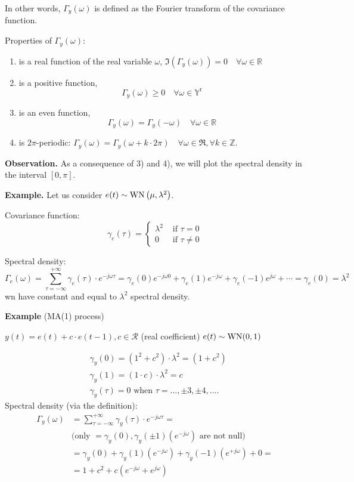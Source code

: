 In other words, $\Gamma_y(\omega)$ is defined as the Fourier transform of the covariance function.

Properties of $\Gamma_{y}(\omega)$:
\begin{enumerate}
	\item is a real function of the real variable $\omega$, $\Im\left(\Gamma_{y}(\omega)\right)=0 \quad \forall \omega \in \mathbb{R}$
	\item is a positive function,
	$$
		\Gamma_{y}(\omega) \geq 0 \quad \forall \omega \in \mathbb{Y}^{\mathrm{r}}
	$$
	\item is an even function,
	$$
		\Gamma_{y}(\omega)=\Gamma_{y}(-\omega) \quad \forall \omega \in \mathbb{R}
	$$
	\item is $2\pi$-periodic: $\Gamma_{y}(\omega)=\Gamma_{y}(\omega+k \cdot 2 \pi) \quad \forall \omega \in \Re, \forall k \in \mathbb{Z}$.
\end{enumerate}

\textbf{Observation.}
As a consequence of 3) and 4), we will plot the spectral density in the interval $[0, \pi]$.

\textbf{Example.}
Let us consider $e(t) \sim \operatorname{WN}\left(\mu, \lambda^{2}\right)$. 

Covariance function:
\[
	\gamma_{e}(\tau)= \begin{cases}\lambda^{2} & \text { if } \tau=0 \\ 0 & \text { if } \tau \neq 0\end{cases}
\]


Spectral density:
\[
	\Gamma_{e}(\omega) =\sum_{\tau=-\infty}^{+\infty} \gamma_{e}(\tau) \cdot e^{-j \omega \tau}=\gamma_{e}(0) e^{-j \omega 0}+\gamma_{e}(1) e^{-j \omega}+\gamma_{e}(-1) e^{j \omega}+\cdots=\gamma_{e}(0)=\lambda^{2}
\]
\gls{wn} have constant and equal to $\lambda^{2}$ spectral density.

\textbf{Example} (MA(1) process)

$y(t)=e(t)+c \cdot e(t-1), c \in \mathcal{R}$ (real coefficient)
$e(t)\sim \operatorname{WN}(0,1 )$

\begin{align*}
	&\gamma_{y}(0)=\left(1^{2}+c^{2}\right)\cdot \lambda^{2}=(1+c^{2})\\
	&\gamma_{y}(1)=(1 \cdot c) \cdot \lambda^{2}=c \\
	&\gamma_{y}(\tau)=0 \text { when } \tau=\ldots, \pm 3, \pm 4, \ldots .
\end{align*}
Spectral density (via the definition):
\begin{align*}
	\Gamma_{y}(\omega)&=\sum_{\tau=-\infty}^{+\infty} \gamma_{y}(\tau) \cdot e^{-j \omega \tau}= \\
	&\text{(only $=\gamma_{y}(0), \gamma_{y}(\pm 1)\left(e^{-j \omega}\right)$ are not null)} \\
	&=\gamma_{y}(0)+\gamma_{y}(1)\left(e^{-j \omega}\right)+\gamma_{y}(-1)\left(e^{+j \omega}\right)+0= \\
	&=1+c^{2}+c\left(e^{-j \omega}+e^{j \omega}\right)
\end{align*}

